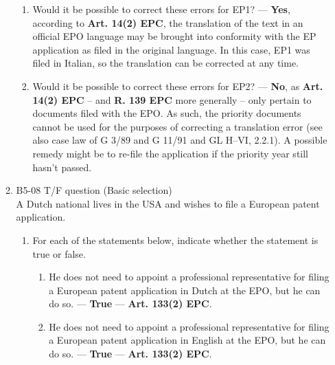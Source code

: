\documentclass{report}
\newcommand{\T}{--- \textbf{True} }
\begin{document}
\begin{enumerate}[label=\textbf{Answer \arabic*}]
\begin{enumerate}[label=\textbf{Answer \arabic*}]
    \begin{enumerate}[label=(\alph*)]
        \item Would it be possible to correct these errors for EP1? --- \textbf{Yes}, according to \textbf{Art. 14(2) EPC}, the translation of the text in an official EPO language may be brought into conformity with the EP application as filed in the original language. In this case, EP1 was filed in Italian, so the translation can be corrected at any time. 
        \item Would it be possible to correct these errors for EP2? --- \textbf{No}, as \textbf{Art. 14(2) EPC} -- and \textbf{R. 139 EPC} more generally -- only pertain to documents filed with the EPO. As such, the priority documents cannot be used for the purposes of correcting a translation error (see also case law of \textsc{G 3/89} and \textsc{G 11/91} and \textsc{GL H--VI, 2.2.1}). A possible remedy might be to re-file the application if the priority year still hasn't passed. 
    \end{enumerate}

    \item %
    B5-08 \quad T/F question (Basic selection) \\
    A Dutch national lives in the USA and wishes to file a European patent application.
   
    \begin{enumerate}[label=(\alph*)]
        \item For each of the statements below, indicate whether the statement is true or false.
        \begin{enumerate}[label={(\alph{enumi}.\arabic*)}]
            \item He does not need to appoint a professional representative for filing a European patent application in Dutch at the EPO, but he can do so. \T  --- \textbf{Art. 133(2) EPC}.
            \item He does not need to appoint a professional representative for filing a European patent application in English at the EPO, but he can do so. \T  --- \textbf{Art. 133(2) EPC}.
        \end{enumerate}
        

\end{enumerate}
\end{enumerate}
\end{enumerate}
\end{document}
